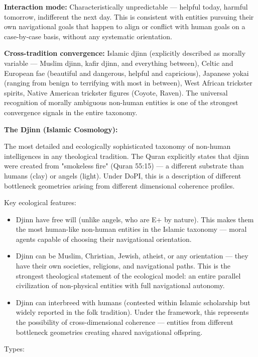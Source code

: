 \textbf{Interaction mode:} Characteristically unpredictable — helpful today, harmful tomorrow, indifferent the next day. This is consistent with entities pursuing their own navigational goals that happen to align or conflict with human goals on a case-by-case basis, without any systematic orientation.


\textbf{Cross-tradition convergence:} Islamic djinn (explicitly described as morally variable — Muslim djinn, kafir djinn, and everything between), Celtic and European fae (beautiful and dangerous, helpful and capricious), Japanese yokai (ranging from benign to terrifying with most in between), West African trickster spirits, Native American trickster figures (Coyote, Raven). The universal recognition of morally ambiguous non-human entities is one of the strongest convergence signals in the entire taxonomy.


\textbf{The Djinn (Islamic Cosmology):}


The most detailed and ecologically sophisticated taxonomy of non-human intelligences in any theological tradition. The Quran explicitly states that djinn were created from "smokeless fire" (Quran 55:15) — a different substrate than humans (clay) or angels (light). Under DoPI, this is a description of different bottleneck geometries arising from different dimensional coherence profiles.


Key ecological features:

\begin{itemize}[nosep,leftmargin=*]
  \item Djinn have free will (unlike angels, who are E+ by nature). This makes them the most human-like non-human entities in the Islamic taxonomy — moral agents capable of choosing their navigational orientation.
  \item Djinn can be Muslim, Christian, Jewish, atheist, or any orientation — they have their own societies, religions, and navigational paths. This is the strongest theological statement of the ecological model: an entire parallel civilization of non-physical entities with full navigational autonomy.
  \item Djinn can interbreed with humans (contested within Islamic scholarship but widely reported in the folk tradition). Under the framework, this represents the possibility of cross-dimensional coherence — entities from different bottleneck geometries creating shared navigational offspring.
\end{itemize}


Types:

